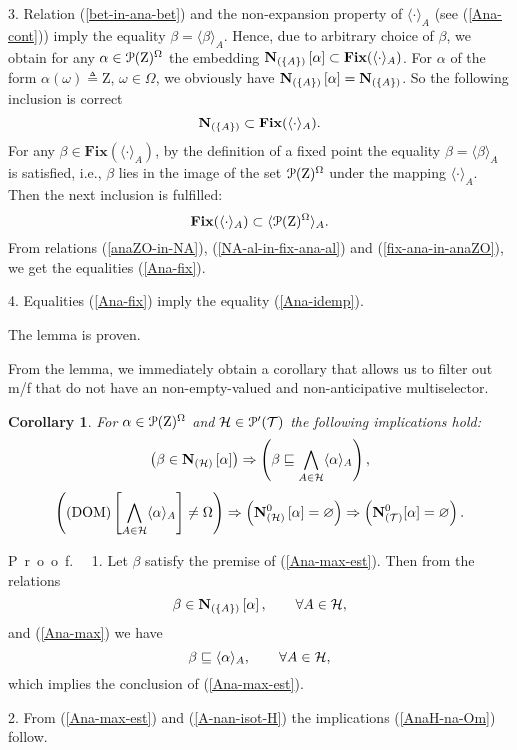 \documentclass[sn-mathphys,Numbered,pdflatex]{sn-jnl}%
\theoremstyle{thmstyleone}%
\theoremstyle{thmstyletwo}%
\theoremstyle{thmstylethree}%
\newtheorem{cor}{Corollary}
\renewcommand{\proof}{\par\mbox{P r o o f.}\ \ }
\newcommand{\beq}{\begin{equation}}
\newcommand{\eeq}{\end{equation}}
\newcommand{\mydef}{\mathrel{\triangleq}}%
\newcommand{\icP}[1]{\EuScript{P}({#1})}%
\newcommand{\icPp}[1]{\EuScript{P^\prime}({#1})}%
\newcommand{\myLe}{\mathrel{\sqsubseteq}}%
\newcommand{\naOm}{\ensuremath{\Omega}}%
\newcommand{\naZ}{\ensuremath{\mathrm{Z}}}%
\newcommand{\naTc}{\ensuremath{\mathcal{T}}}%
\newcommand{\naN}{\AnaN{\naTc}{}}%
\newcommand{\AnaN}[2]{\mathbf{N}_{(#1)}\setbox0=\hbox{\text{$#2$}}\ifdim\wd0=0pt\else\left[{#2}\right]\fi}%
\newcommand{\AnaNO}[2]{\mathbf{N}^0_{(#1)}\setbox0=\hbox{\text{$#2$}}\ifdim\wd0=0pt\else\left[{#2}\right]\fi}%
\newcommand{\nado}[1]{(\mathrm{DOM})\setbox0=\hbox{\text{$#1$}}\ifdim\wd0=0pt\else\left[{#1}\right]\fi}%
\newcommand{\naNO}[1]{\naN^0\setbox0=\hbox{\text{$#1$}}\ifdim\wd0=0pt\else[{#1}]\fi}%
\newcommand{\Ana}[2]{\ensuremath{\langle{#1}\rangle_{#2}}}%
\newcommand{\fix}[1]{\ensuremath{{\mathbf{Fix}({#1})}}}%
\newcommand{\fref}[1]{{\rm(\ref{#1})}}   %
\begin{document}
3.
Relation \fref{bet-in-ana-bet} and the non-expansion property of $\Ana{\cdot}{A}$ (see \fref{Ana-cont}) imply the equality $\beta=\Ana{\beta} {A}$.
Hence, due to arbitrary choice of $\beta$, we obtain for any $\alpha\in\icP\naZ^\naOm$ the embedding $\AnaN{\{A\}}{\alpha}\subset\fix{\Ana{\cdot}{A}}$.
For $\alpha$ of the form $\alpha(\omega)\mydef\naZ$, $\omega\in\naOm$, we obviously have $\AnaN{\{A\}}\alpha=\AnaN{\{A \}}{}$.
So the following inclusion is correct
\beq\label{NA-al-in-fix-ana-al}
\AnaN{\{A\}}{}\subset\fix{\Ana{\cdot}{A}}.
\eeq
For any $\beta\in\fix{\Ana{\cdot}{A}}$,  by the definition of a fixed point the equality $\beta=\Ana{\beta}{A}$ is satisfied, i.e., $\beta$ lies in the image of the set $\icP\naZ^\naOm$ under the mapping $\Ana{\cdot}{A}$.
Then the next inclusion is fulfilled:
\beq\label{fix-ana-in-anaZO}
\fix{\Ana{\cdot}{A}}\subset\Ana{\icP\naZ^\naOm}{A}.
\eeq
From relations \fref{anaZO-in-NA}, \fref{NA-al-in-fix-ana-al} and \fref{fix-ana-in-anaZO}, we get the equalities \fref{Ana-fix}.

4.
Equalities \fref{Ana-fix} imply the equality \fref{Ana-idemp}.

The lemma is proven.

\bigskip

From the lemma, we immediately obtain a corollary that allows us to filter out m/f that do not have an non-empty-valued and non-anticipative multiselector.

\begin{cor}\label{lem-Ana-max-est}
For $\alpha\in\icP\naZ^\naOm$ and ${\cal H}\in\icPp\naTc$ the following implications hold:
\beq\label{Ana-max-est}
\left(\beta\in\AnaN{\cal H}\alpha\right)\Rightarrow\left(\beta\myLe\bigwedge_{A\in{\cal H}}\Ana{\alpha}{A}\right),
\eeq
\beq\label{AnaH-na-Om}
\left(\nado{\bigwedge_{A\in{\cal H}}\Ana{\alpha}{A}}\neq\naOm\right)\Rightarrow\left(\AnaNO{\cal H}\alpha= \varnothing\right)\Rightarrow\left(\naNO\alpha=\varnothing\right).
\eeq
\end{cor}

\proof
1.
Let $\beta$ satisfy the premise of \fref{Ana-max-est}.
Then from the relations
$$
\beta\in\AnaN{\{A\}}\alpha, \qquad\forall A\in{\cal H},
$$
and \fref{Ana-max} we have
$$
\beta\myLe\Ana{\alpha}{A}, \qquad\forall A\in{\cal H},
$$
which implies the conclusion of \fref{Ana-max-est}.

2.
From \fref{Ana-max-est} and \fref{A-nan-isot-H} the implications \fref{AnaH-na-Om} follow.
\end{document}

